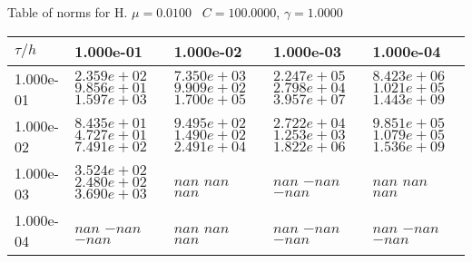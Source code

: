 \begin{center}
Table of norms for H. $\mu = 0.0100$ \, $C = 100.0000$, $\gamma = 1.0000$
  
\begin{tabular}{|p{1in}|p{1in}|p{1in}|p{1in}|p{1in}|} \hline
$\tau / h$ &1.000e-01 &1.000e-02 &1.000e-03 &1.000e-04 \\ \hline 
1.000e-01 & $2.359e+02$  $9.856e+01$  $1.597e+03$  & $7.350e+03$  $9.909e+02$  $1.700e+05$  & $2.247e+05$  $2.798e+04$  $3.957e+07$  & $8.423e+06$  $1.021e+05$  $1.443e+09$  \\ \hline 
1.000e-02 & $8.435e+01$  $4.727e+01$  $7.491e+02$  & $9.495e+02$  $1.490e+02$  $2.491e+04$  & $2.722e+04$  $1.253e+03$  $1.822e+06$  & $9.851e+05$  $1.079e+05$  $1.536e+09$  \\ \hline 
1.000e-03 & $3.524e+02$  $2.480e+02$  $3.690e+03$  & $nan$  $nan$  $nan$  & $nan$  $-nan$  $-nan$  & $nan$  $nan$  $nan$  \\ \hline 
1.000e-04 & $nan$  $-nan$  $-nan$  & $nan$  $nan$  $nan$  & $nan$  $-nan$  $-nan$  & $nan$  $-nan$  $-nan$  \\ \hline 

\end{tabular}\\[20pt]
\end{center}
